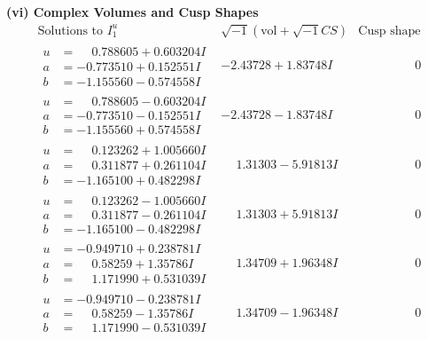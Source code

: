 \documentclass[1p]{elsarticle_modified}
\theoremstyle{definition}
\newcommand{\I}{\sqrt{-1}}
\begin{document}
\newpage\flushleft \textbf{(vi) Complex Volumes and Cusp Shapes}
$$\begin{array}{c|c|c}  
\text{Solutions to }I^u_{1}& \I (\text{vol} + \sqrt{-1}CS) & \text{Cusp shape}\\
 \hline 
\begin{aligned}
u &= \phantom{-}0.788605 + 0.603204 I \\
a &= -0.773510 + 0.152551 I \\
b &= -1.155560 - 0.574558 I\end{aligned}
 & -2.43728 + 1.83748 I & \phantom{-0.000000 } 0 \\ \hline\begin{aligned}
u &= \phantom{-}0.788605 - 0.603204 I \\
a &= -0.773510 - 0.152551 I \\
b &= -1.155560 + 0.574558 I\end{aligned}
 & -2.43728 - 1.83748 I & \phantom{-0.000000 } 0 \\ \hline\begin{aligned}
u &= \phantom{-}0.123262 + 1.005660 I \\
a &= \phantom{-}0.311877 + 0.261104 I \\
b &= -1.165100 + 0.482298 I\end{aligned}
 & \phantom{-}1.31303 - 5.91813 I & \phantom{-0.000000 } 0 \\ \hline\begin{aligned}
u &= \phantom{-}0.123262 - 1.005660 I \\
a &= \phantom{-}0.311877 - 0.261104 I \\
b &= -1.165100 - 0.482298 I\end{aligned}
 & \phantom{-}1.31303 + 5.91813 I & \phantom{-0.000000 } 0 \\ \hline\begin{aligned}
u &= -0.949710 + 0.238781 I \\
a &= \phantom{-}0.58259 + 1.35786 I \\
b &= \phantom{-}1.171990 + 0.531039 I\end{aligned}
 & \phantom{-}1.34709 + 1.96348 I & \phantom{-0.000000 } 0 \\ \hline\begin{aligned}
u &= -0.949710 - 0.238781 I \\
a &= \phantom{-}0.58259 - 1.35786 I \\
b &= \phantom{-}1.171990 - 0.531039 I\end{aligned}
 & \phantom{-}1.34709 - 1.96348 I & \phantom{-0.000000 } 0 \\ \hline\begin{aligned}

\end{aligned}
\end{array}$$
\end{document}
